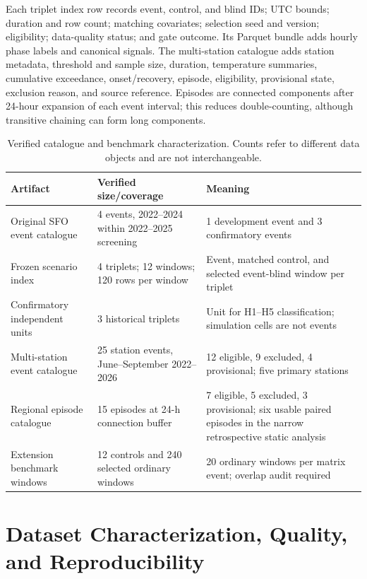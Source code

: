 \documentclass[pdflatex,sn-mathphys-num]{sn-jnl}
\begin{document}
Each triplet index row records event, control, and blind IDs; UTC bounds; duration and row count; matching covariates; selection seed and version; eligibility; data-quality status; and gate outcome. Its Parquet bundle adds hourly phase labels and canonical signals. The multi-station catalogue adds station metadata, threshold and sample size, duration, temperature summaries, cumulative exceedance, onset/recovery, episode, eligibility, provisional state, exclusion reason, and source reference. Episodes are connected components after 24-hour expansion of each event interval; this reduces double-counting, although transitive chaining can form long components.

\begin{table}[t]
\caption{Verified catalogue and benchmark characterization. Counts refer to different data objects and are not interchangeable.}
\label{tab:catalogue}
\small
\begin{tabular}{@{}p{}p{}p{}@{}}
\toprule
\textbf{Artifact} & \textbf{Verified size/coverage} & \textbf{Meaning} \\
\midrule
Original SFO event catalogue & 4 events, 2022--2024 within 2022--2025 screening & 1 development event and 3 confirmatory events \\
Frozen scenario index & 4 triplets; 12 windows; 120 rows per window & Event, matched control, and selected event-blind window per triplet \\
Confirmatory independent units & 3 historical triplets & Unit for H1--H5 classification; simulation cells are not events \\
Multi-station event catalogue & 25 station events, June--September 2022--2026 & 12 eligible, 9 excluded, 4 provisional; five primary stations \\
Regional episode catalogue & 15 episodes at 24-h connection buffer & 7 eligible, 5 excluded, 3 provisional; six usable paired episodes in the narrow retrospective static analysis \\
Extension benchmark windows & 12 controls and 240 selected ordinary windows & 20 ordinary windows per matrix event; overlap audit required \\
\bottomrule
\end{tabular}
\end{table}

\section{Dataset Characterization, Quality, and Reproducibility}\label{sec:quality}
\end{document}
